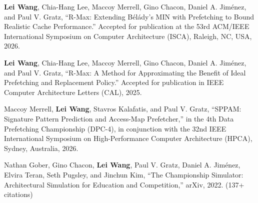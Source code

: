 
\begin{cventries}
\cventry
    {} %
    {} %
    {} %
    {} %
    {
      \begin{cvitems} %
          \item {\textbf{Lei Wang}, Chia-Hang Lee, Maccoy Merrell, Gino Chacon, Daniel A. Jiménez, and Paul V. Gratz, ``R-Max: Extending B\'{e}l\'{a}dy's MIN with Prefetching to Bound Realistic Cache Performance.'' Accepted for publication at the 53rd ACM/IEEE International Symposium on Computer Architecture (ISCA), Raleigh, NC, USA, 2026.}
          \item {\textbf{Lei Wang}, Chia-Hang Lee, Maccoy Merrell, Gino Chacon, Daniel A. Jiménez, and Paul V. Gratz, ``R-Max: A Method for Approximating the Benefit of Ideal Prefetching and Replacement Policy.'' Accepted for publication in IEEE Computer Architecture Letters (CAL), 2025.}          
         \item {Maccoy Merrell, \textbf{Lei Wang}, Stavros Kalafatis, and Paul V. Gratz, ``SPPAM: Signature Pattern Prediction and Access-Map Prefetcher,'' in the 4th Data Prefetching Championship (DPC-4),
         in conjunction with the 32nd IEEE International Symposium on High-Performance Computer Architecture (HPCA), Sydney, Australia, 2026.}
         \item {Nathan Gober, Gino Chacon, \textbf{Lei Wang}, Paul V. Gratz, Daniel A. Jiménez, Elvira Teran, Seth Pugsley, and Jinchun Kim, ``The Championship Simulator: Architectural Simulation for Education and Competition,'' arXiv, 2022. (137+ citations)}                
      \end{cvitems}
    }
\end{cventries}

